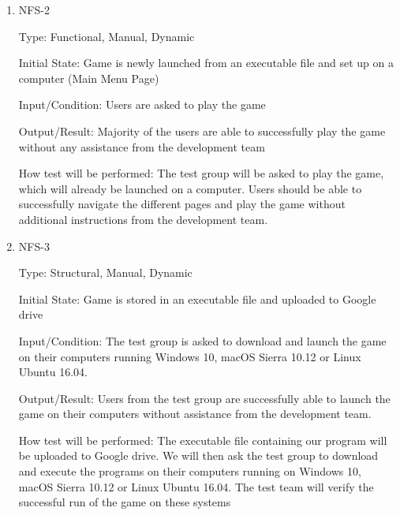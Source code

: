 \documentclass[12pt, titlepage]{article}
\begin{document}
\begin{enumerate}


\item{NFS-2\\}

Type: Functional, Manual, Dynamic 
					
Initial State: Game is newly launched from an executable file and set up on a computer (Main Menu Page)
					
Input/Condition: Users are asked to play the game
					
Output/Result: Majority of the users are able to successfully play the game without any assistance from the development team
					
How test will be performed: The test group will be asked to play the game, which will already be launched on a computer. Users should be able to successfully navigate the different pages and play the game without additional instructions from the development team.

\item{NFS-3\\}

Type: Structural, Manual, Dynamic 
					
Initial State: Game is stored in an executable file and uploaded to Google drive
					
Input/Condition: The test group is asked to download and launch the game on their computers running Windows 10, macOS Sierra 10.12 or Linux Ubuntu 16.04.
					
Output/Result: Users from the test group are successfully able to launch the game on their computers without assistance from the development team.
					
How test will be performed: The executable file containing our program will be uploaded to Google drive. We will then ask the test group to download and execute the programs on their computers running on  Windows 10, macOS Sierra 10.12 or Linux Ubuntu 16.04. The test team will verify the successful run of the game on these systems


\end{enumerate}
\end{document}
